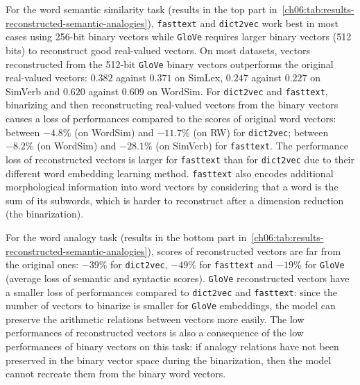       For the word semantic similarity task (results in the top part
      in~\autoref{ch06:tab:results-reconstructed-semantic-analogies}),
      \texttt{fasttext} and \texttt{dict2vec} work best in most cases using
      256-bit binary vectors while \texttt{GloVe} requires larger binary vectors
      (512 bits) to reconstruct good real-valued vectors. On most datasets,
      vectors reconstructed from the 512-bit \texttt{GloVe} binary vectors
      outperforms the original real-valued vectors: $0.382$ against $0.371$ on
      SimLex, $0.247$ against $0.227$ on SimVerb and $0.620$ against $0.609$ on
      WordSim. For \texttt{dict2vec} and \texttt{fasttext}, binarizing and then
      reconstructing real-valued vectors from the binary vectors causes a loss
      of performances compared to the scores of original word vectors: between
      $-4.8\%$ (on WordSim) and $-11.7\%$ (on RW) for \texttt{dict2vec}; between
      $-8.2\%$ (on WordSim) and $-28.1\%$ (on SimVerb) for \texttt{fasttext}.
      The performance loss of reconstructed vectors is larger for
      \texttt{fasttext} than for \texttt{dict2vec} due to their different word
      embedding learning method. \texttt{fasttext} also encodes additional
      morphological information into word vectors by considering that a word is
      the sum of its subwords, which is harder to reconstruct after a dimension
      reduction (the binarization). \bigskip %

      \noindent For the word analogy task (results in the bottom part
      in~\autoref{ch06:tab:results-reconstructed-semantic-analogies}), scores of
      reconstructed vectors are far from the original ones: $-39\%$ for
      \texttt{dict2vec}, $-49\%$ for \texttt{fasttext} and $-19\%$ for
      \texttt{GloVe} (average loss of semantic and syntactic scores).
      \texttt{GloVe} reconstructed vectors have a smaller loss of performances
      compared to \texttt{dict2vec} and \texttt{fasttext}: since the number of
      vectors to binarize is smaller for \texttt{GloVe} embeddings, the model
      can preserve the arithmetic relations between vectors more easily. The low
      performances of reconstructed vectors is also a consequence of the low
      performances of binary vectors on this task: if analogy relations have not
      been preserved in the binary vector space during the binarization, then
      the model cannot recreate them from the binary word vectors.

